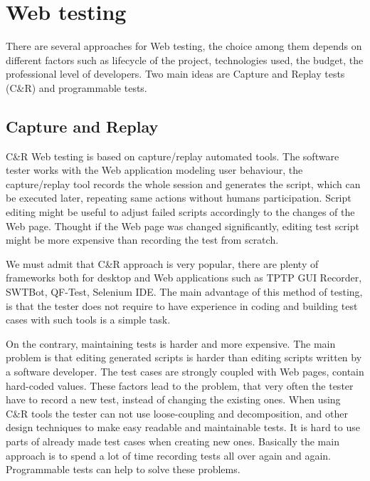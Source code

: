 	\chapter{Web testing}
	\label{ch:Webtesting}

		There are several approaches for Web testing, the choice among them depends on
		different factors such as lifecycle of the project, technologies used, the
		budget, the professional level of developers. Two main ideas are Capture and
		Replay tests (C\&R) and programmable tests.
		
		\section{Capture and Replay}
		\label{sec:captureReplay}
			C\&R Web testing is based on capture/replay automated
			tools. \cite{CaptureReplay7} The software tester works with the Web
			application modeling user behaviour, the capture/replay tool records the
			whole session and generates the script, which can be executed later,
			repeating same actions without humans participation. Script editing might
			 be useful to adjust failed scripts accordingly
			to the changes of the Web page. Thought if the Web page was changed
			significantly, editing test script might be more expensive than recording the
			test from scratch. 
			
			We must admit that C\&R approach is very popular, there are plenty of
			frameworks both for desktop and Web applications such as TPTP GUI Recorder, SWTBot, QF-Test,
			Selenium IDE.
			The main advantage of this method of testing, is that the tester does not
			require to have experience in coding and building test cases with such tools is a simple task. 
			
			On the contrary, maintaining tests is harder and more expensive.
			The main problem is that editing generated scripts is harder than editing
			scripts written by a software developer. The test cases are strongly coupled
			with Web pages, contain hard-coded values. These factors lead to the
			problem, that very often the tester have to record a new test, instead of
			changing the existing ones. When using C\&R tools the tester can
			not use loose-coupling and decomposition, and other design techniques to make
			easy readable and maintainable tests. It is hard to use parts of already made
			test cases when creating new ones. Basically the main
			approach is to spend a lot of time recording tests all over again and again.
			Programmable tests can help to solve these problems.
			
